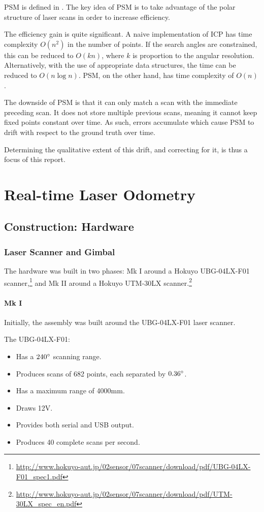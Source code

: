 \documentclass[12pt,oneside,a4paper]{book}
\begin{document}
PSM is defined in \cite{polarscanmatching}. The key idea of PSM is to
take advantage of the polar structure of laser scans in order to increase
efficiency. 

The efficiency gain is quite significant. A naive implementation of
ICP has time complexity $O(n^2)$ in the number of points. If the
search angles are constrained, this can be reduced to $O(kn)$, where
$k$ is proportion to the angular resolution. Alternatively, with the
use of appropriate data structures, the time can be reduced to
$O(n\log n)$. PSM, on the other hand, has time complexity of $O(n)$.

The downside of PSM is that it can only match a scan with the
immediate preceding scan. It does not store multiple previous scans,
meaning it cannot keep fixed points constant over time. As such,
errors accumulate which cause PSM to drift with respect to the ground
truth over time.

Determining the qualitative extent of this drift, and correcting for
it, is thus a focus of this report.

\part{Real-time Laser Odometry}
\chapter{Construction: Hardware}
\label{sec:hardware}

\section{Laser Scanner and Gimbal}
\label{sec:laser-scanner-gimbal}

The hardware was built in two phases: Mk I around a Hokuyo
UBG-04LX-F01
scanner,\footnote{\url{http://www.hokuyo-aut.jp/02sensor/07scanner/download/pdf/UBG-04LX-F01_spec1.pdf}}
and Mk II around a Hokuyo UTM-30LX scanner.\footnote{\url{http://www.hokuyo-aut.jp/02sensor/07scanner/download/pdf/UTM-30LX_spec_en.pdf}}


\subsection{Mk I}
\label{sec:mk-i}

Initially, the assembly was built around the UBG-04LX-F01 laser
scanner.

The UBG-04LX-F01:
\begin{itemize}
\item Has a $240\degree$ scanning range.
\item Produces scans of 682 points, each separated by $0.36\degree$.
\item Has a maximum range of 4000mm.
\item Draws 12V.
\item Provides both serial and USB output.
\item Produces 40 complete scans per second.
\end{itemize}
\end{document}
